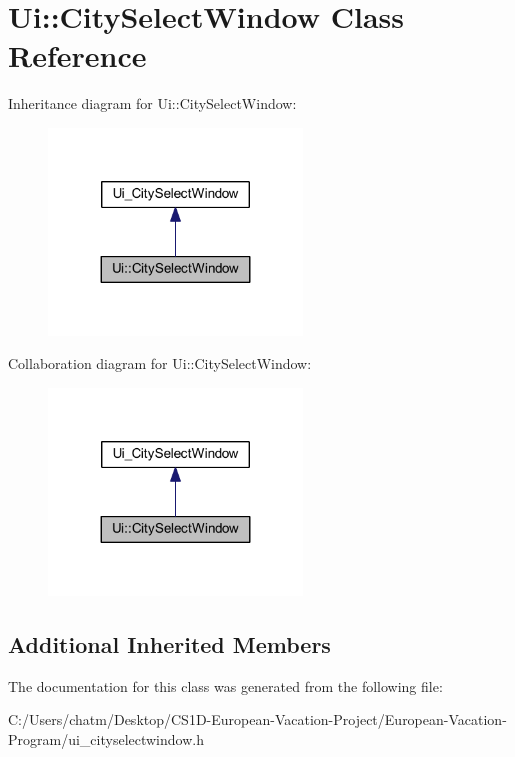 \hypertarget{class_ui_1_1_city_select_window}{}\section{Ui\+::City\+Select\+Window Class Reference}
\label{class_ui_1_1_city_select_window}


Inheritance diagram for Ui\+::City\+Select\+Window\+:
\nopagebreak
\begin{figure}[H]
\begin{center}
\leavevmode
\includegraphics[width=191pt]{class_ui_1_1_city_select_window__inherit__graph}
\end{center}
\end{figure}


Collaboration diagram for Ui\+::City\+Select\+Window\+:
\nopagebreak
\begin{figure}[H]
\begin{center}
\leavevmode
\includegraphics[width=191pt]{class_ui_1_1_city_select_window__coll__graph}
\end{center}
\end{figure}
\subsection*{Additional Inherited Members}


The documentation for this class was generated from the following file\+:\begin{DoxyCompactItemize}
\item 
C\+:/\+Users/chatm/\+Desktop/\+C\+S1\+D-\/\+European-\/\+Vacation-\/\+Project/\+European-\/\+Vacation-\/\+Program/ui\+\_\+cityselectwindow.\+h\end{DoxyCompactItemize}
